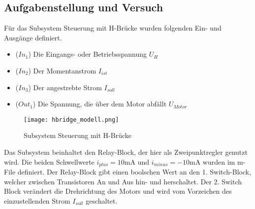 \subsection{Aufgabenstellung und Versuch}

Für das Subsystem Steuerung mit H-Brücke wurden folgenden Ein- und Ausgänge
definiert.\\

\begin{itemize}
    \item ($In_1$) Die Eingangs- oder Betriebsspannung $U_H$
    \item ($In_2$) Der Momentanstrom $I_{ist}$
    \item ($In_3$) Der angestrebte Strom $I_{soll}$
    \item ($Out_1$) Die Spannung, die über dem Motor abfällt $U_{Motor}$
\end{itemize}


\begin{figure}[H]
    \centering
    \texttt{[image: hbridge\_modell.png]}
    \caption{Subsystem Steuerung mit H-Brücke}
    \label{fig:Subsystem H-Bridge}
\end{figure}

Das Subsystem beinhaltet den Relay-Block, der hier als Zweipunktregler genutzt
wird. Die beiden Schwellwerte $i_{plus}=10\mathrm{mA}$ und $i_{minus}=-10
\mathrm{mA}$ wurden im m-File definiert. Der Relay-Block gibt einen boolschen Wert
an den 1. Switch-Block, welcher zwischen Transistoren An und Aus hin- und
herschaltet. Der 2. Switch Block verändert die Drehrichtung des Motors und
wird vom Vorzeichen des einzustellenden Strom $I_{soll}$ geschaltet.